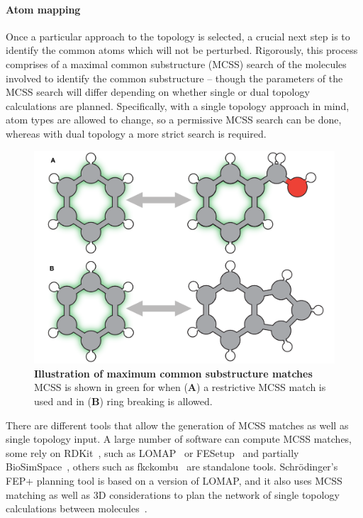 \documentclass[9pt,bestpractices]{livecoms}
\begin{document}
\paragraph{Atom mapping}
Once a particular approach to the topology is selected, a crucial next step is to identify the common atoms which will not be perturbed.
Rigorously, this process comprises of a maximal common substructure (MCSS) search of the molecules involved to identify the common substructure -- though the parameters of the MCSS search will differ depending on whether single or dual topology calculations are planned.
Specifically, with a single topology approach in mind, atom types are allowed to change, so a permissive MCSS search can be done, whereas with dual topology a more strict search is required.
\begin{figure}
    \includegraphics[width=0.95\linewidth]{figures/fig4_mcs/Figure.pdf}
    \caption{\textbf{Illustration of maximum common substructure matches} MCSS is shown in green for when (\textbf{A}) a restrictive MCSS match is used and in (\textbf{B}) ring breaking is allowed.}
    \label{fig:fig_mcss}
\end{figure} 
%
There are different tools that allow the generation of MCSS matches as well as single topology input. A large number of software can compute MCSS matches, some rely on RDKit~\cite{rdkit2019Dec}, such as LOMAP~\cite{liu2013lead} or FESetup~\cite{loeffler2015fesetup} and partially BioSimSpace~\cite{hedges2019biosimspace}, others such as fkckombu~\cite{kawabata20143d} are standalone tools. Schr\"{o}dinger's FEP+ planning tool is based on a version of LOMAP, and it also uses MCSS matching as well as 3D considerations to plan the network of single topology calculations between molecules~\cite{wang2015accurate}. 
\end{document}

